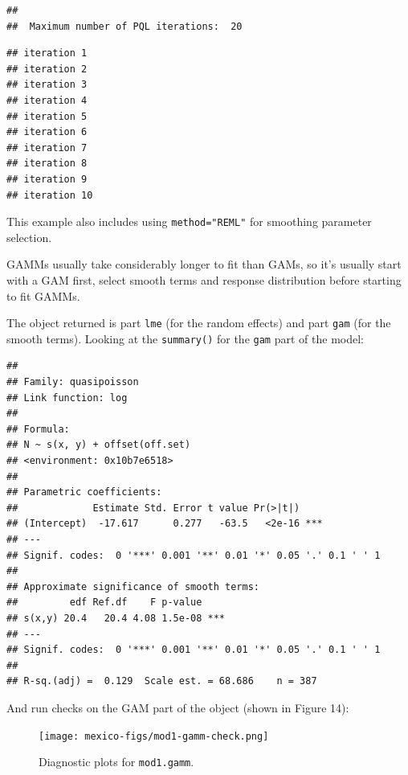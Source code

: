 \documentclass[]{article}
\newenvironment{Shaded}{}{}
\newcommand{\KeywordTok}[1]{\textcolor[rgb]{0.00,0.44,0.13}{\textbf{{#1}}}}
\newcommand{\NormalTok}[1]{{#1}}
\begin{document}
\begin{verbatim}
## 
##  Maximum number of PQL iterations:  20
\end{verbatim}

\begin{verbatim}
## iteration 1
## iteration 2
## iteration 3
## iteration 4
## iteration 5
## iteration 6
## iteration 7
## iteration 8
## iteration 9
## iteration 10
\end{verbatim}

This example also includes using \texttt{method="REML"} for smoothing
parameter selection.

GAMMs usually take considerably longer to fit than GAMs, so it's usually
start with a GAM first, select smooth terms and response distribution
before starting to fit GAMMs.

The object returned is part \texttt{lme} (for the random effects) and
part \texttt{gam} (for the smooth terms). Looking at the
\texttt{summary()} for the \texttt{gam} part of the model:

\begin{Shaded}
\end{Shaded}

\begin{verbatim}
## 
## Family: quasipoisson 
## Link function: log 
## 
## Formula:
## N ~ s(x, y) + offset(off.set)
## <environment: 0x10b7e6518>
## 
## Parametric coefficients:
##             Estimate Std. Error t value Pr(>|t|)    
## (Intercept)  -17.617      0.277   -63.5   <2e-16 ***
## ---
## Signif. codes:  0 '***' 0.001 '**' 0.01 '*' 0.05 '.' 0.1 ' ' 1
## 
## Approximate significance of smooth terms:
##         edf Ref.df    F p-value    
## s(x,y) 20.4   20.4 4.08 1.5e-08 ***
## ---
## Signif. codes:  0 '***' 0.001 '**' 0.01 '*' 0.05 '.' 0.1 ' ' 1
## 
## R-sq.(adj) =  0.129  Scale est. = 68.686    n = 387
\end{verbatim}

And run checks on the GAM part of the object (shown in Figure 14):

\begin{Shaded}
\end{Shaded}

\begin{figure}[htbp]
\centering
\texttt{[image: mexico-figs/mod1-gamm-check.png]}
\caption{Diagnostic plots for \texttt{mod1.gamm}.}
\end{figure}
\end{document}
